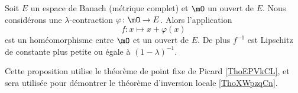 \begin{lemma} \label{LemGZoqknC}
    Soit \( E\) un espace de Banach (métrique complet) et \( \mO\) un ouvert de \( E\). Nous considérons une \( \lambda\)-contraction \( \varphi\colon \mO\to E\). Alors l'application
    \begin{equation}
    f\colon x\mapsto x+\varphi(x)
    \end{equation}
    est un homéomorphisme entre \( \mO\) et un ouvert de \( E\). De plus \( f^{-1}\) est Lipschitz de constante plus petite ou égale à \( (1-\lambda)^{-1}\).
\end{lemma}
Cette proposition utilise le théorème de point fixe de Picard \ref{ThoEPVkCL},
et sera utilisée pour démontrer le théorème d'inversion locale \ref{ThoXWpzqCn}.

